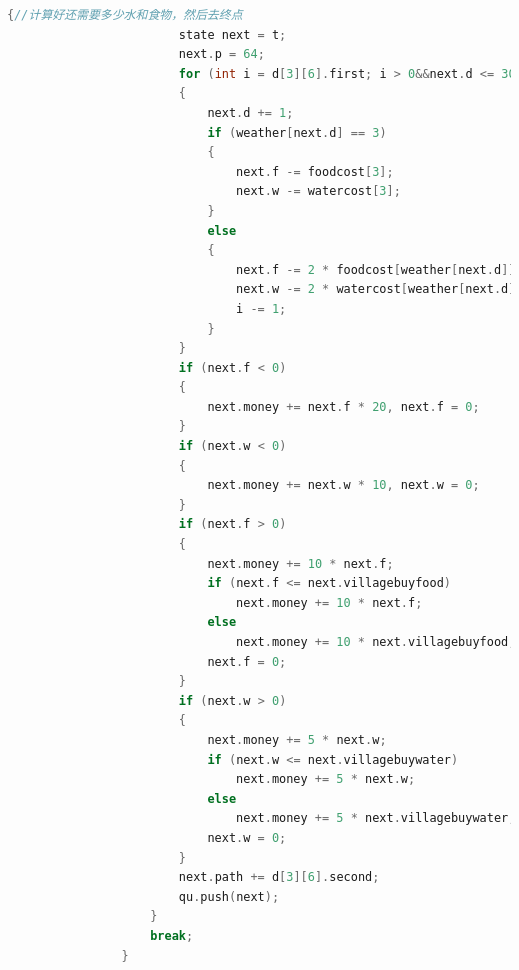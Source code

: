 \documentclass[withoutpreface,bwprint]{cumcmthesis} %
\begin{document}
\begin{appendices}
\begin{lstlisting}[language=c++]
                    {//计算好还需要多少水和食物，然后去终点
                        state next = t;
                        next.p = 64;
                        for (int i = d[3][6].first; i > 0&&next.d <= 30;)
                        {
                            next.d += 1;
                            if (weather[next.d] == 3)
                            {
                                next.f -= foodcost[3];
                                next.w -= watercost[3];
                            }
                            else
                            {
                                next.f -= 2 * foodcost[weather[next.d]];
                                next.w -= 2 * watercost[weather[next.d]];
                                i -= 1;
                            }
                        }
                        if (next.f < 0)
                        {
                            next.money += next.f * 20, next.f = 0;
                        }
                        if (next.w < 0)
                        {
                            next.money += next.w * 10, next.w = 0;
                        }
                        if (next.f > 0)
                        {
                            next.money += 10 * next.f;
                            if (next.f <= next.villagebuyfood)
                                next.money += 10 * next.f;
                            else
                                next.money += 10 * next.villagebuyfood;
                            next.f = 0;
                        }
                        if (next.w > 0)
                        {
                            next.money += 5 * next.w;
                            if (next.w <= next.villagebuywater)
                                next.money += 5 * next.w;
                            else
                                next.money += 5 * next.villagebuywater;
                            next.w = 0;
                        }
                        next.path += d[3][6].second;
                        qu.push(next);
                    }
                    break;
                }
    

\end{lstlisting}
\end{appendices}
\end{document}
